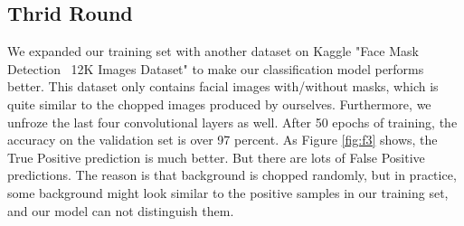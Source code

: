 \documentclass[10pt,a4paper]{report}
\begin{document}
\subsection{Thrid Round}
We expanded our training set with another dataset on Kaggle "Face Mask Detection ~12K Images Dataset" to make our classification model performs better. This dataset only contains facial images with/without masks, which is quite similar to the chopped images produced by ourselves. Furthermore, we unfroze the last four convolutional layers as well. After 50 epochs of training, the accuracy on the validation set is over 97 percent. As Figure \ref{fig:f3} shows, the True Positive prediction is much better. But there are lots of False Positive predictions. The reason is that background is chopped randomly, but in practice, some background might look similar to the positive samples in our training set, and our model can not distinguish them.
\end{document}
